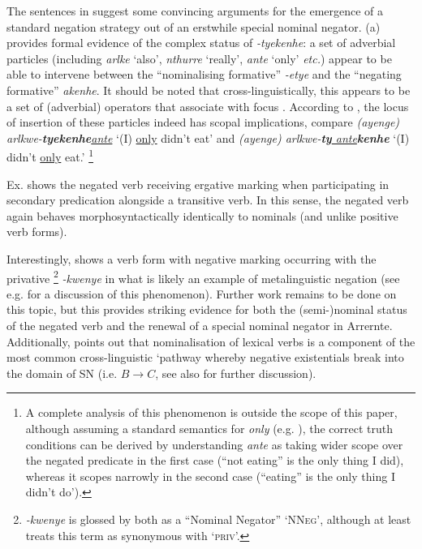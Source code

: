 \documentclass[output=paper,draft,draftmode,colorlinks,citecolor=brown]{langscibook}
\begin{document}
The sentences in  suggest some
        convincing arguments for the emergence of a standard negation
        strategy out of an erstwhile special nominal negator. (a) provides
        formal evidence of the complex status of \textit{-tyekenhe}: a set
        of adverbial particles (including \textit{\textdblhyphen arlke}
        `also', \textit{\textdblhyphen nthurre} `really',
        \textit{\textdblhyphen ante} `only' \textit{etc.}) appear to be
        able to intervene between the ``nominalising formative''
        \textit{-etye} and the ``negating formative''
        \textit{\textdblhyphen akenhe}. It should be noted that
        cross-linguistically, this appears to be a set of (adverbial)
        operators that associate with focus
        \citep[e.g.][]{Jackendoff1972,Rooth1985}. According to
        \citet[381]{Wilkins1989}, the locus of insertion of these particles
        indeed has scopal implications, compare \textit{(ayenge)
        arlkwe-\textbf{tyekenhe}\uline{\textdblhyphen ante}} `(I) \uline{only}
        didn't eat' and \textit{(ayenge)
        arlkwe-\textbf{ty}\uline{\guillemotleft
        ante\guillemotright}\textbf{kenhe}} `(I) didn't \uline{only} eat.'%
%
\footnote{A complete analysis of this phenomenon is outside the scope of this paper, although assuming a standard semantics for \textit{only} (e.g. \citealt{Horn1969}), the correct truth conditions can be derived by understanding \textit{\textdblhyphen ante} as taking wider scope over the negated predicate in the first case (``not eating'' is the only thing I did), whereas it scopes narrowly in the second case (``eating'' is the only thing I didn't do').}
 
Ex.  shows the negated verb receiving ergative marking when participating in secondary predication alongside a transitive verb. In this sense, the negated verb again behaves morphosyntactically identically to nominals (and unlike positive verb forms).

Interestingly,  shows a verb
form with negative marking occurring with the privative%
%
\footnote{\textit{-kwenye} is glossed by both \citealt{Henderson2013,Wilkins1989} as a ``Nominal Negator'' `\textsc{NNeg}', although at least \citet[158]{Wilkins1989} treats this term as synonymous with `\textsc{priv}'.} 
%
\textit{-kwenye} in what is likely an example of metalinguistic negation (see e.g. \citealt[19]{HornWansing2017} for a discussion of this phenomenon). Further work remains to be done on this topic, but this provides striking evidence for both the (semi-)nominal status of the negated verb and the renewal of a special nominal negator in Arrernte. Additionally, \citet[171]{Veselinova2016} points out that nominalisation of lexical verbs is a component of the most common cross-linguistic `pathway whereby negative existentials break into the domain of SN (i.e. $B\to C$, see also  for further discussion).
\end{document}
